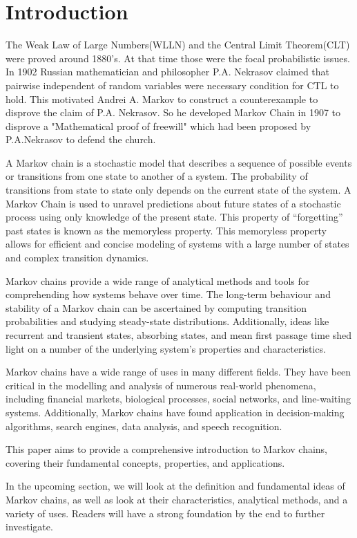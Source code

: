\chapter{Introduction}
The Weak Law of Large Numbers(WLLN) and the Central Limit Theorem(CLT) were proved around  1880's. At that time those were the focal probabilistic issues.
In 1902 Russian mathematician and philosopher P.A. Nekrasov claimed that pairwise independent of random variables were necessary condition for CTL to hold. 
This motivated Andrei A. Markov to construct a counterexample to disprove the claim of P.A. Nekrasov. So he developed Markov Chain in 1907 to disprove a 
"Mathematical proof of freewill" which had been proposed by P.A.Nekrasov to defend the church.

 A Markov chain is a stochastic model that describes a sequence of possible
events or transitions from one state to another of a system. The probability of transitions
from state to state only depends on the current state of the system. A Markov Chain is
used to unravel predictions about future states of a stochastic process using only knowledge
of the present state. This property of “forgetting” past states is known as the memoryless
property. This memoryless property allows for efficient and concise modeling of systems with a large number of states and complex transition dynamics.

Markov chains provide a wide range of analytical methods and tools for comprehending how systems behave over time. The long-term behaviour and stability of a Markov chain can be ascertained by computing transition probabilities and studying steady-state distributions. Additionally, ideas like recurrent and transient states, absorbing states, and mean first passage time shed light on a number of the underlying system's properties and characteristics.

Markov chains have a wide range of uses in many different fields. They have been critical in the modelling and analysis of numerous real-world phenomena, including financial markets, biological processes, social networks, and line-waiting systems. Additionally, Markov chains have found application in decision-making algorithms, search engines, data analysis, and speech recognition.

This paper aims to provide a comprehensive introduction to Markov chains, covering their fundamental concepts, properties, and applications. 

In the upcoming section, we will look at the definition and fundamental ideas of Markov chains, as well as look at their characteristics, analytical methods, and a variety of uses. Readers will have a strong foundation by the end to further investigate.
